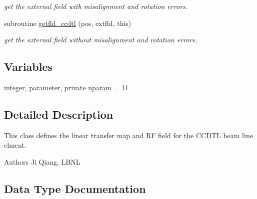 \begin{DoxyCompactItemize}
\begin{DoxyCompactList}\small\item\em get the external field with misalignment and rotation errors. \end{DoxyCompactList}\item 
subroutine \mbox{\hyperlink{namespaceccdtlclass_a62eb43f6a732d52951d468e91a2312cb}{getfld\+\_\+ccdtl}} (pos, extfld, this)
\begin{DoxyCompactList}\small\item\em get the external field without misalignment and rotation errors. \end{DoxyCompactList}\end{DoxyCompactItemize}
\subsection*{Variables}
\begin{DoxyCompactItemize}
\item 
integer, parameter, private \mbox{\hyperlink{namespaceccdtlclass_a0e8e95c86f2dab6639fc79f05859b6ea}{nparam}} = 11
\end{DoxyCompactItemize}


\subsection{Detailed Description}
This class defines the linear transfer map and RF field for the C\+C\+D\+TL beam line elment. 

\begin{DoxyAuthor}{Authors}
Ji Qiang, L\+B\+NL 
\end{DoxyAuthor}


\subsection{Data Type Documentation}
\label{structccdtlclass_1_1ccdtl}
